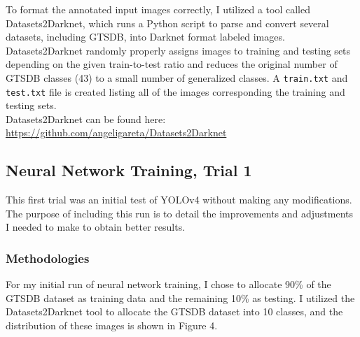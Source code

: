 \documentclass{article}
\begin{document}
            To format the annotated input images correctly, I utilized a tool called Datasets2Darknet, which runs a Python script to parse and convert several datasets, including GTSDB, into Darknet format labeled images. Datasets2Darknet randomly properly assigns images to training and testing sets depending on the given train-to-test ratio and reduces the original number of GTSDB classes (43) to a small number of generalized classes. A \texttt{train.txt} and \texttt{test.txt} file is created listing all of the images corresponding the training and testing sets. \\
            
            Datasets2Darknet can be found here: \url{https://github.com/angeligareta/Datasets2Darknet}
        
        \subsection{Neural Network Training, Trial 1}
        
            This first trial was an initial test of YOLOv4 without making any modifications. The purpose of including this run is to detail the improvements and adjustments I needed to make to obtain better results.
        
            \subsubsection{Methodologies}
            
            For my initial run of neural network training, I chose to allocate 90\% of the GTSDB dataset as training data and the remaining 10\% as testing. I utilized the Datasets2Darknet tool to allocate the GTSDB dataset into 10 classes, and the distribution of these images is shown in Figure 4. 
            
\end{document}

